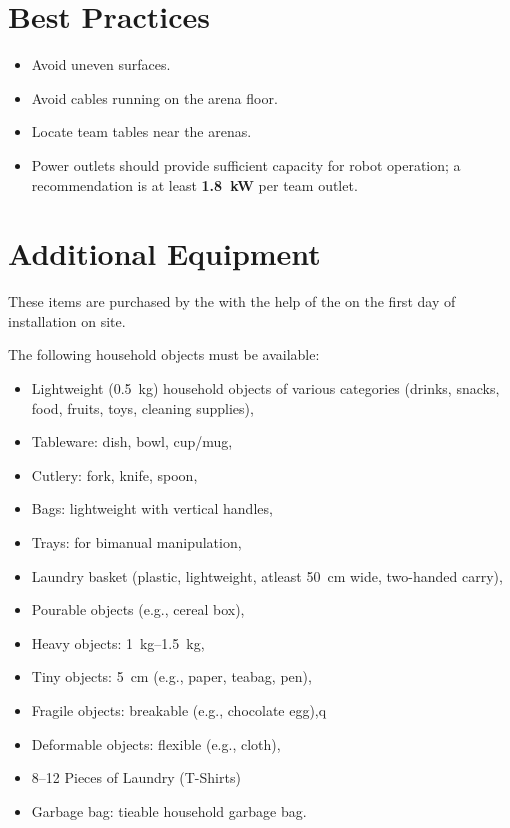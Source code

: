 \section{Best Practices}
\begin{itemize}
    \item Avoid uneven surfaces.
    \item Avoid cables running on the arena floor.
    \item Locate team tables near the arenas.
    \item Power outlets should provide sufficient capacity for robot operation; a recommendation is at least \textbf{1.8~kW} per team outlet.
\end{itemize}

\section{Additional Equipment}

These items are purchased by the \OC{} with the help of the \LOC{} on the first day of installation on site.

The following household objects must be available:
\begin{itemize}
    \item Lightweight (\qty{0.5}{\kilogram}) household objects of various categories (drinks, snacks, food, fruits, toys, cleaning supplies),
    \item Tableware: dish, bowl, cup/mug,
    \item Cutlery: fork, knife, spoon,
    \item Bags: lightweight with vertical handles,
    \item Trays: for bimanual manipulation,
    \item Laundry basket (plastic, lightweight, atleast \qty{50}{\centi\metre} wide, two-handed carry),
    \item Pourable objects (e.g., cereal box),
    \item Heavy objects: \qtyrange{1}{1.5}{\kilogram},
    \item Tiny objects: \qty{5}{\centi\metre} (e.g., paper, teabag, pen),
    \item Fragile objects: breakable (e.g., chocolate egg),q
    \item Deformable objects: flexible (e.g., cloth),
    \item 8--12 Pieces of Laundry (T-Shirts)
    \item Garbage bag: tieable household garbage bag.
\end{itemize}

